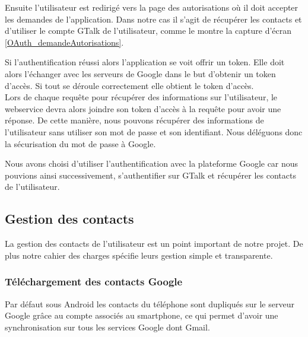 Ensuite l'utilisateur est redirigé vers la page des autorisations où il doit accepter les demandes de l'application.
Dans notre cas il s'agit de récupérer les contacts et d'utiliser le compte GTalk de l'utilisateur, comme le montre la capture d'écran \ref{OAuth_demandeAutorisations}.

Si l'authentification réussi alors l'application se voit offrir un token.
Elle doit alors l'échanger avec les serveurs de Google dans le but d'obtenir un token d'accès.
Si tout se déroule correctement elle obtient le token d'accès.
\\


Lors de chaque requête pour récupérer des informations sur l'utilisateur, le webservice devra alors
joindre son token d'accès à la requête pour avoir une réponse. De cette manière, nous pouvons récupérer
des informations de l'utilisateur sans utiliser son mot de passe et son identifiant. Nous déléguons donc
la sécurisation du mot de passe à Google.

Nous avons choisi d'utiliser l'authentification avec la plateforme Google car nous pouvions ainsi 
successivement, s'authentifier sur GTalk et récupérer les contacts de l'utilisateur.




\subsection{Gestion des contacts}

La gestion des contacts de l'utilisateur est un point important de notre projet.
De plus notre cahier des charges spécifie leurs gestion simple et transparente.


\subsubsection{Téléchargement des contacts Google}
\label{Téléchargement des contacts Google}

Par défaut sous Android les contacts du téléphone sont dupliqués sur le serveur Google grâce au compte associés au smartphone, ce qui permet d'avoir une synchronisation sur tous les services Google dont Gmail.

